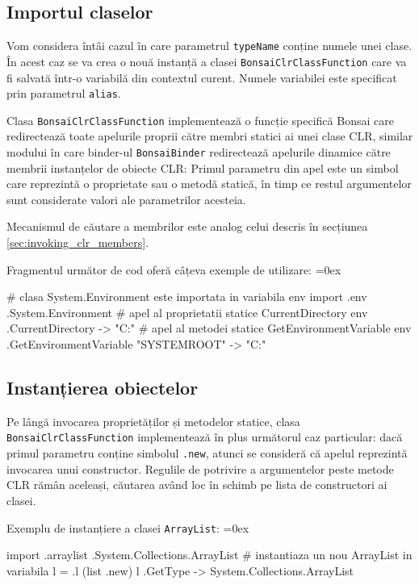 \documentclass[12pt,a4paper]{memoir}
\renewcommand{\c}{\texttt}
\newenvironment{code}
{
\definecolor{shadecolor}{gray}{0.91}
\topsep=0ex
\relax
\shaded
\verbatim
}
{
\endverbatim
\endshaded
}
\begin{document}
\subsection{Importul claselor}

Vom considera întâi cazul în care parametrul \c{typeName} conține numele unei clase. În acest caz se va crea o nouă instanță a clasei \c{BonsaiClrClassFunction} care va fi salvată într-o variabilă din contextul curent. Numele variabilei este specificat prin parametrul \c{alias}. 

Clasa \c{BonsaiClrClassFunction} implementează o funcție specifică Bonsai care redirectează toate apelurile proprii către membri statici ai unei clase CLR, similar modului în care binder-ul \c{BonsaiBinder} redirectează apelurile dinamice către membrii instanțelor de obiecte CLR: Primul parametru din apel este un simbol care reprezintă o proprietate sau o metodă statică, în timp ce restul argumentelor sunt considerate valori ale parametrilor acesteia. 

Mecanismul de căutare a membrilor este analog celui descris în secțiunea \ref{sec:invoking_clr_members}.

Fragmentul următor de cod oferă câțeva exemple de utilizare:
\begin{code}
# clasa System.Environment este importata in variabila env
import .env .System.Environment
# apel al proprietatii statice CurrentDirectory
env .CurrentDirectory
  -> "C:\Users\Eugen\Projects"
# apel al metodei statice GetEnvironmentVariable
env .GetEnvironmentVariable "SYSTEMROOT"
  -> "C:\Windows"
\end{code}

\subsection{Instanțierea obiectelor}

Pe lângă invocarea proprietăților și metodelor statice, clasa \c{BonsaiClrClassFunction} implementează în plus următorul caz particular: dacă primul parametru conține simbolul \c{.new}, atunci se consideră că apelul reprezintă invocarea unui constructor. Regulile de potrivire a argumentelor peste metode CLR rămân aceleași, căutarea având loc în schimb pe lista de constructori ai clasei.

Exemplu de instanțiere a clasei \c{ArrayList}:
\begin{code}
import .arraylist .System.Collections.ArrayList
# instantiaza un nou ArrayList in variabila l
= .l (list .new)
l .GetType
  -> System.Collections.ArrayList
\end{code}
\end{document}
